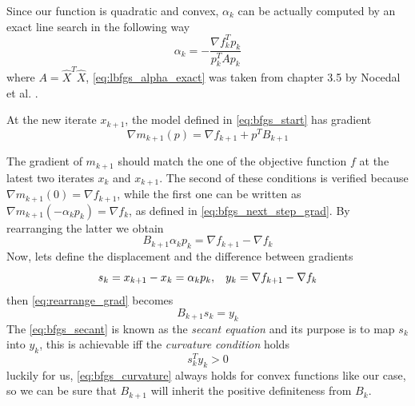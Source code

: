 \noindent Since our function is quadratic and convex, $\alpha_k$ can be actually computed by an exact line search in the following way
\begin{equation}
    \alpha_k = -\frac{\nabla f_k^T p_k}{p_k^TAp_k}
    \label{eq:lbfgs_alpha_exact}
\end{equation}
where $A=\hat{X}^T\hat{X}$, \eqref{eq:lbfgs_alpha_exact} was taken from chapter 3.5 by Nocedal et al. \cite{nocedal1999numerical}.
\vspace{3mm}

\noindent At the new iterate $x_{k+1}$, the model defined in \eqref{eq:bfgs_start} has gradient
\begin{equation}
    \nabla m_{k+1} (p) = \nabla f_{k+1} + p^T B_{k+1}
    \label{eq:bfgs_next_step_grad}
\end{equation}

\noindent The gradient of $m_{k+1}$ should match the one of the objective function $f$ at the latest two iterates $x_k$ and $x_{k+1}$. The second of these conditions is verified because $\nabla m_{k+1}(0) = \nabla f_{k+1}$, while the first one can be written as $\nabla m_{k+1}(-\alpha_k p_k)=\nabla f_k$, as defined in \eqref{eq:bfgs_next_step_grad}. By rearranging the latter we obtain 
\begin{equation}
    B_{k+1}\alpha_k p_k = \nabla f_{k+1} - \nabla f_k
    \label{eq:rearrange_grad}
\end{equation}
Now, lets define the displacement and the difference between gradients
\begin{equation}
    s_k = x_{k+1} - x_{k} = \alpha_k p_k, \hspace{3mm} y_k = \nabla f_{k+1} - \nabla f_k
    \label{eq:bfgs_displacement_gradient}
\end{equation}
then \eqref{eq:rearrange_grad} becomes
\begin{equation}
    B_{k+1}s_k = y_k
    \label{eq:bfgs_secant}
\end{equation}
The \eqref{eq:bfgs_secant} is known as the \textit{secant equation} and its purpose is to map $s_k$ into $y_k$, this is achievable iff the \textit{curvature condition} holds
\begin{equation}
    s_{k}^{T}y_k > 0
    \label{eq:bfgs_curvature}
\end{equation}
luckily for us, \eqref{eq:bfgs_curvature} always holds for convex functions like our case, so we can be sure that $B_{k+1}$ will inherit the positive definiteness from $B_k$.
\vspace{3mm}

